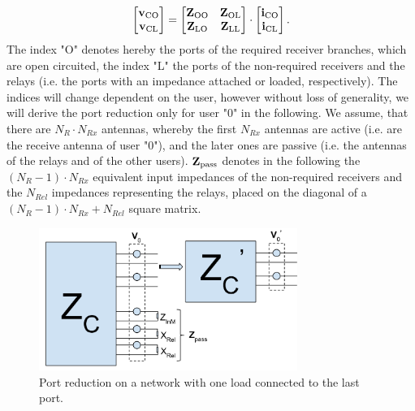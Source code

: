 \begin{align}
\label{eq:ocl_matrix}
\begin{bmatrix}
\mathbf{v}_\text{CO} \\
\mathbf{v}_\text{CL}
\end{bmatrix}
=
\begin{bmatrix}
\mathbf{Z}_\text{OO} & \mathbf{Z}_\text{OL}\\
\mathbf{Z}_\text{LO} & \mathbf{Z}_\text{LL}
\end{bmatrix}\cdot
\begin{bmatrix}
\mathbf{i}_\text{CO} \\
\mathbf{i}_\text{CL}
\end{bmatrix}.
\end{align}
The index "O" denotes hereby the ports of the required receiver branches, which are open circuited, the index "L" the ports of the non-required receivers and the relays (i.e. the ports with an impedance attached or loaded, respectively).
The indices will change dependent on the user, however without loss of generality, we will derive the port reduction only for user "0" in the following.
We assume, that there are $N_R \cdot N_{Rx}$ antennas, whereby the first $N_{Rx}$ antennas are active (i.e. are the receive antenna of user "0"), and the later ones are passive (i.e. the antennas of the relays and of the other users).
$\mathbf{Z}_{\text{pass}}$ denotes in the following the $(N_{R}-1)\cdot N_{Rx}$ equivalent input impedances of the non-required receivers and the $N_{Rel}$ impedances representing the relays, placed on the diagonal of a $(N_{R}-1)\cdot N_{Rx}+N_{Rel}$ square matrix.
\begin{figure}[h]
\begin{center}
\includegraphics[width=0.75\textwidth]{images/Port_reduction.png}
\caption{Port reduction on a network with one load connected to the last port.}
\label{fig:port_reduction}
\end{center}
\end{figure}

